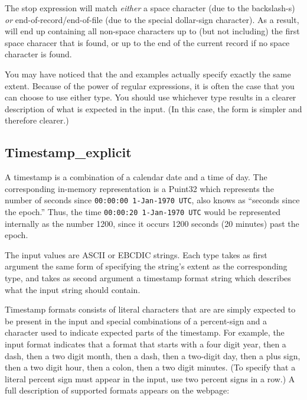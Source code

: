 %
\noindent
The stop expression will match {\em either\/} a space character (due to the backslash-s) {\em or\/}
end-of-record/end-of-file (due to the special dollar-sign character).  As a result,
 will end up containing all non-space characters up to (but not including) the 
first space characer that is found, or up to the end of the current record if no space
character is found.  

You may have noticed that the  and
 examples actually specify exactly the same extent.  
Because of the power of regular expressions, it is often the case that you can
choose to use either type.  You should use whichever type results in a
clearer description of what is expected in the input.  (In this case,
the form is simpler and therefore clearer.)

\subsection{Timestamp\_explicit}

\begin{small}
\aedBegin{}
\aedEnd{}
\end{small}

\noindent
A timestamp is a combination of a calendar date and a time of day.
The corresponding in-memory representation is a Puint32 which
represents the number of seconds since {\tt 00:00:00 1-Jan-1970 UTC},
also knows as ``seconds since the epoch.''
Thus, the time {\tt 00:00:20 1-Jan-1970 UTC} would be represented
internally as the number 1200, since it occurs 1200 seconds
(20 minutes) past the epoch.

The input values are ASCII or EBCDIC strings.  Each
 type takes as first argument the same form of
specifying the string's extent as the corresponding  type, and
takes as second argument a timestamp format string which describes
what the input string should contain.

Timestamp formats consists of literal characters that are are simply
expected to be present in the input and special combinations of a
percent-sign and a character used to indicate expected parts of the
timestamp.  For example, the input format
indicates that a format that starts with a 
four digit year, then a dash, then a two digit month, then a dash,
then a two-digit day, then a plus sign, then a two digit hour, then a
colon, then a two digit minutes.  (To specify that a literal percent
sign must appear in the input, use two percent signs in a row.)  A
full description of supported formats appears on the webpage:



